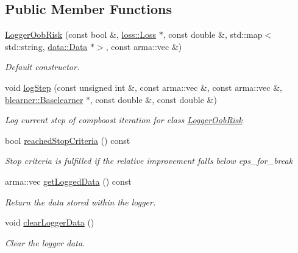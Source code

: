 \subsection*{Public Member Functions}
\begin{DoxyCompactItemize}
\item 
\mbox{\hyperlink{classlogger_1_1_logger_oob_risk_a2ade553132c86f485d0057b2808ab028}{Logger\+Oob\+Risk}} (const bool \&, \mbox{\hyperlink{classloss_1_1_loss}{loss\+::\+Loss}} $\ast$, const double \&, std\+::map$<$ std\+::string, \mbox{\hyperlink{classdata_1_1_data}{data\+::\+Data}} $\ast$$>$, const arma\+::vec \&)
\begin{DoxyCompactList}\small\item\em Default constructor. \end{DoxyCompactList}\item 
void \mbox{\hyperlink{classlogger_1_1_logger_oob_risk_a4b0ea670a7970bca31037efab99cc06a}{log\+Step}} (const unsigned int \&, const arma\+::vec \&, const arma\+::vec \&, \mbox{\hyperlink{classblearner_1_1_baselearner}{blearner\+::\+Baselearner}} $\ast$, const double \&, const double \&)
\begin{DoxyCompactList}\small\item\em Log current step of compboost iteration for class {\ttfamily \mbox{\hyperlink{classlogger_1_1_logger_oob_risk}{Logger\+Oob\+Risk}}} \end{DoxyCompactList}\item 
bool \mbox{\hyperlink{classlogger_1_1_logger_oob_risk_a15c6792b0e1d2acbdd907f697f2884f3}{reached\+Stop\+Criteria}} () const
\begin{DoxyCompactList}\small\item\em Stop criteria is fulfilled if the relative improvement falls below {\ttfamily eps\+\_\+for\+\_\+break} \end{DoxyCompactList}\item 
arma\+::vec \mbox{\hyperlink{classlogger_1_1_logger_oob_risk_a1529f62cf58ad8bc5922a7d39ed3515e}{get\+Logged\+Data}} () const
\begin{DoxyCompactList}\small\item\em Return the data stored within the logger. \end{DoxyCompactList}\item 
void \mbox{\hyperlink{classlogger_1_1_logger_oob_risk_a8330dd8fd748c8ea1e0027f1b2c7ea50}{clear\+Logger\+Data}} ()
\begin{DoxyCompactList}\small\item\em Clear the logger data. \end{DoxyCompactList}\item 
$$
\end{DoxyCompactItemize}
